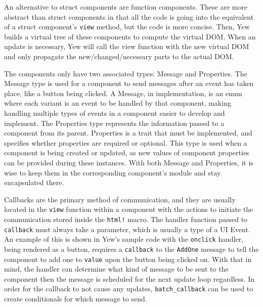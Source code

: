 \documentclass[
    paper=letter,
    parskip=half,
    fontsize=12pt,
    titlepage=firstiscover,
    toc=bibliography,
    numbers=endperiod
]{scrartcl}
\begin{document}
An alternative to struct components are function
components\cite{yew-function-components}. These are more abstract than
struct components in that all the code is going into the equivalent of a
struct component's \texttt{view} method, but the code is more concise.
Then, Yew builds a virtual tree of these components to compute the
virtual DOM. When an update is necessary, Yew will call the view
function with the new virtual DOM and only propagate the
new/changed/necessary parts to the actual DOM.

The components only have two associated types: Message and Properties.
The Message type is used for a component to send messages after an event
has taken place, like a button being clicked. A Message, in
implementation, is an enum where each variant is an event to be handled
by that component, making handling multiple types of events in a
component easier to develop and implement. The Properties type
represents the information passed to a component from its parent.
Properties is a trait that must be implemented, and specifies whether
properties are required or optional. This type is used when a component
is being created or updated, as new values of component properties can
be provided during these instances. With both Message and Properties, it
is wise to keep them in the corresponding component's module and stay
encapsulated there.

Callbacks are the primary method of communication, and they are usually
located in the \texttt{view} function within a component with the
actions to initiate the communication stored inside the \texttt{html!}
macro. The handler function passed to \texttt{callback} must always take
a parameter, which is usually a type of a UI Event. An example of this
is shown in Yew's sample code with the \texttt{onclick} handler, being
rendered as a button, requires a \texttt{callback} to the
\texttt{AddOne} message to tell the component to add one to
\texttt{value} upon the button being clicked on. With that in mind, the
handler can determine what kind of message to be sent to the component
then the message is scheduled for the next update loop regardless. In
order for the callback to not cause any updates,
\texttt{batch\_callback} can be used to create conditionals for which
message to send.
\end{document}
